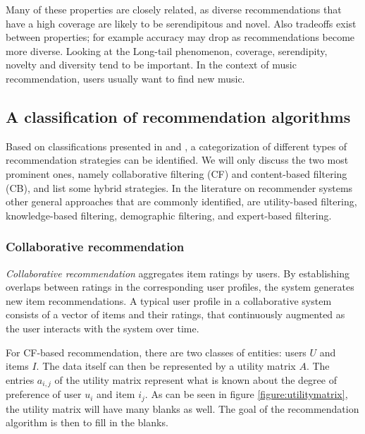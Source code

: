 Many of these properties are closely related, as diverse recommendations that have a high coverage are likely to be serendipitous and novel. Also tradeoffs exist between properties; for example accuracy may drop as recommendations become more diverse\cite{shani:2011:9780387858197}. Looking at the Long-tail phenomenon, coverage, serendipity, novelty and diversity tend to be important. In the context of music recommendation, users usually want to find new music\cite{levy:2010}.


\subsection{A classification of recommendation algorithms}\label{chapter:literature_study:section:computer:subsection:algorithms}

Based on classifications presented in \cite{burke:2002} and \cite{celma:2008:phd}, a categorization of different types of recommendation strategies can be identified. We will only discuss the two most prominent ones, namely collaborative filtering (CF) and content-based filtering (CB)\cite{herlocker:2000, rajaraman:2012}, and list some hybrid strategies. In the literature on recommender systems other general approaches that are commonly identified, are utility-based filtering, knowledge-based filtering, demographic filtering, and expert-based filtering\cite{burke:2002, bostandjiev:2012}.


\subsubsection{Collaborative recommendation}\label{chapter:literature_study:section:computer:subsection:algorithms:subsubsection:cf}

\emph{Collaborative recommendation} aggregates item ratings by users. By establishing overlaps between ratings in the corresponding user profiles, the system generates new item recommendations\cite{burke:2002, herlocker:2000}. A typical user profile in a collaborative system consists of a vector of items and their ratings, that continuously augmented as the user interacts with the system over time\cite{burke:2002}. 

For CF-based recommendation, there are two classes of entities: users $U$ and items $I$. The data itself can then be represented by a utility matrix $A$. The entries $a_{i,j}$ of the utility matrix represent what is known about the degree of preference of user $u_{i}$ and item $i_{j}$\cite{rajaraman:2012}. As can be seen in figure \ref{figure:utilitymatrix}, the utility matrix will have many blanks as well. The goal of the recommendation algorithm is then to fill in the blanks\cite{rajaraman:2012}.

